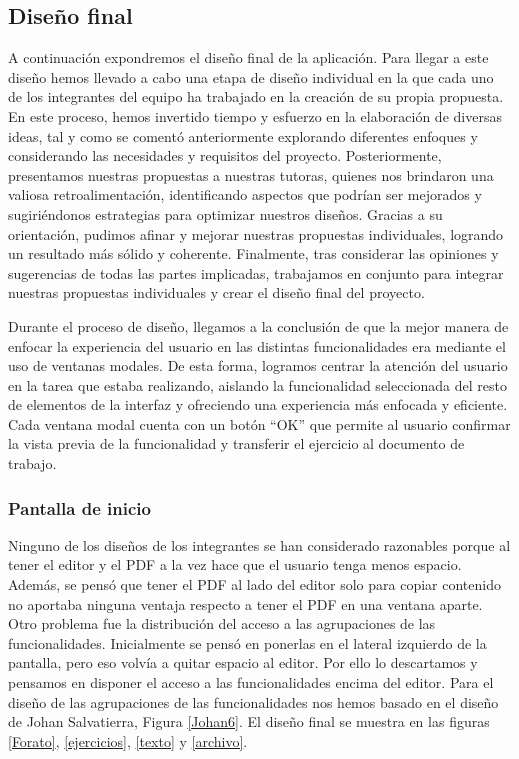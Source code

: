 \subsection{Diseño final}\label{subsec:DisenyoFinal}
A continuación expondremos el diseño final de la aplicación. Para llegar a este diseño hemos llevado a cabo una etapa de diseño individual en la que cada uno de los integrantes del equipo ha trabajado en la creación de su propia propuesta. En este proceso, hemos invertido tiempo y esfuerzo en la elaboración de diversas ideas, tal y como se comentó anteriormente explorando diferentes enfoques y considerando las necesidades y requisitos del proyecto. Posteriormente, presentamos nuestras propuestas a nuestras tutoras, quienes nos brindaron una valiosa retroalimentación, identificando aspectos que podrían ser mejorados y sugiriéndonos estrategias para optimizar nuestros diseños. Gracias a su orientación, pudimos afinar y mejorar nuestras propuestas individuales, logrando un resultado más sólido y coherente. Finalmente, tras considerar las opiniones y sugerencias de todas las partes implicadas, trabajamos en conjunto para integrar nuestras propuestas individuales y crear el diseño final del proyecto.

Durante el proceso de diseño, llegamos a la conclusión de que la mejor manera de enfocar la experiencia del usuario en las distintas funcionalidades era mediante el uso de ventanas modales. De esta forma, logramos centrar la atención del usuario en la tarea que estaba realizando, aislando la funcionalidad seleccionada del resto de elementos de la interfaz y ofreciendo una experiencia más enfocada y eficiente. Cada ventana modal cuenta con un botón ``OK'' que permite al usuario confirmar la vista previa de la funcionalidad y transferir el ejercicio al documento de trabajo.

\subsubsection{Pantalla de inicio}
Ninguno de los diseños de los integrantes se han considerado razonables porque al tener el editor y el PDF a la vez hace que el usuario tenga menos espacio. Además, se pensó que tener el PDF al lado del editor solo para copiar contenido no aportaba ninguna ventaja respecto a tener el PDF en una ventana aparte. Otro problema fue la distribución del acceso a las agrupaciones de las funcionalidades. Inicialmente se pensó en ponerlas en el lateral izquierdo de la pantalla, pero eso volvía a quitar espacio al editor. Por ello lo descartamos y pensamos en disponer el acceso a las funcionalidades encima del editor. Para el diseño de las agrupaciones de las funcionalidades nos hemos basado en el diseño de Johan Salvatierra, Figura \ref{Johan6}. El diseño final se  muestra en las figuras \ref{Forato}, \ref{ejercicios}, \ref{texto} y \ref{archivo}.

